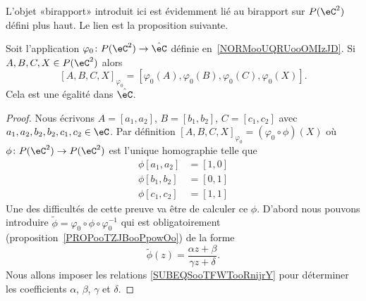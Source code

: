 L'objet «birapport» introduit ici est évidemment lié au birapport sur \( P(\eC^2)\) défini plus haut. Le lien est la proposition suivante.

\begin{proposition}     \label{PROPooLKQQooEOrjwC}
	Soit l'application \( \varphi_0\colon P(\eC^2)\to \hat\eC\) définie en~\ref{NORMooUQRUooOMIzJD}. Si \( A,B,C,X\in P(\eC^2) \) alors
	\begin{equation}        \label{EQooEOZZooMRHJfH}
		[A,B,C,X]_{\varphi_0}=[\varphi_0(A),\varphi_0(B),\varphi_0(C),\varphi_0(X)].
	\end{equation}
	Cela est une égalité dans \( \hat \eC\).
\end{proposition}

\begin{proof}
	Nous écrivons \( A=[a_1,a_2]\), \( B=[b_1,b_2]\), \( C=[c_1,c_2]\) avec \( a_1,a_2,b_2,b_2,c_1,c_2\in \eC\). Par définition \( [A,B,C,X]_{\varphi_0}=(\varphi_0\circ\phi)(X)\) où \( \phi\colon P(\eC^2)\to P(\eC^2)\) est l'unique homographie telle que
	\begin{subequations}        \label{SUBEQSooTFWTooRnijrY}
		\begin{align}
			\phi[a_1,a_2] & =[1,0] \\
			\phi[b_1,b_2] & =[0,1] \\
			\phi[c_1,c_2] & =[1,1]
		\end{align}
	\end{subequations}
	Une des difficultés de cette preuve va être de calculer ce \( \phi\). D'abord nous pouvons introduire \( \tilde \phi=\varphi_0\circ\phi\circ\varphi_0^{-1}\) qui est obligatoirement (proposition~\ref{PROPooTZJBooPpowOo}) de la forme
	\begin{equation}
		\tilde \phi(z)=\frac{ \alpha z+\beta }{ \gamma z+\delta }.
	\end{equation}
	Nous allons imposer les relations \eqref{SUBEQSooTFWTooRnijrY} pour déterminer les coefficients \( \alpha\), \( \beta\), \( \gamma\) et \( \delta\).


\end{proof}
